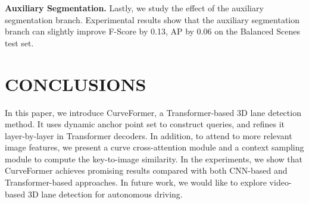 \documentclass[letterpaper, 10 pt, conference]{ieeeconf}
\begin{document}
\textbf{Auxiliary Segmentation.} Lastly, we study the effect of the auxiliary segmentation branch. 
Experimental results show that the auxiliary segmentation branch can slightly improve F-Score by 0.13, AP by 0.06 on the Balanced Scenes test set.


\section{CONCLUSIONS}

In this paper, we introduce CurveFormer, a Transformer-based 3D lane detection method. It uses dynamic anchor point set to construct queries, and refines it layer-by-layer in Transformer decoders. In addition, to attend to more relevant image features, we present a curve cross-attention module and a context sampling module to compute the key-to-image similarity. 
In the experiments, we show that CurveFormer achieves promising results compared with both CNN-based and Transformer-based approaches. In future work, we would like to explore video-based 3D lane detection for autonomous driving.



































\end{document}
